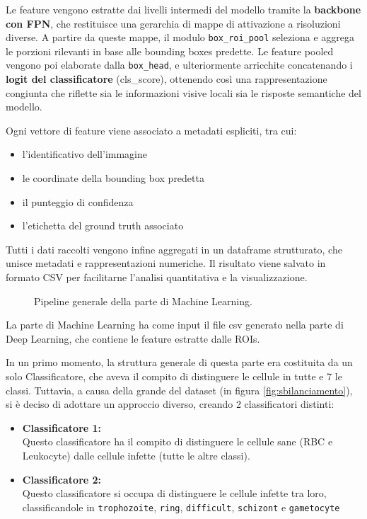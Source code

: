 \documentclass[minted, draw]{../tex/hebdomon}
\begin{document}
Le feature vengono estratte dai livelli intermedi del modello tramite la \textbf{backbone con FPN}, che restituisce una gerarchia di mappe di attivazione a risoluzioni diverse. A partire da queste mappe, il modulo \texttt{box\_roi\_pool} seleziona e aggrega le porzioni rilevanti in base alle bounding boxes predette. Le feature pooled vengono poi elaborate dalla \texttt{box\_head}, e ulteriormente arricchite concatenando i \textbf{logit del classificatore} (cls\_score), ottenendo così una rappresentazione congiunta che riflette sia le informazioni visive locali sia le risposte semantiche del modello.


Ogni vettore di feature viene associato a metadati espliciti, tra cui:
\begin{itemize}
	\item l'identificativo dell'immagine
	\item le coordinate della bounding box predetta
	\item il punteggio di confidenza
	\item l’etichetta del ground truth associato
\end{itemize}
 

Tutti i dati raccolti vengono infine aggregati in un dataframe strutturato, che unisce metadati e rappresentazioni numeriche. Il risultato viene salvato in formato CSV per facilitarne l’analisi quantitativa e la visualizzazione.



%
\begin{figure}[H]
	\centering
	
	\caption{Pipeline generale della parte di Machine Learning.}
\end{figure}
%
La parte di Machine Learning ha come input il file csv generato nella parte di Deep Learning, che contiene le feature estratte dalle ROIs.

In un primo momento, la struttura generale di questa parte era costituita da un solo Classificatore, che aveva il compito di distinguere le cellule in tutte e 7 le classi. Tuttavia, a causa della grande  del dataset (in figura \ref{fig:sbilanciamento}), si è deciso di adottare un approccio diverso, creando 2 classificatori distinti:
\begin{itemize}
	\item \textbf{Classificatore 1:}  \\
	Questo classificatore ha il compito di distinguere le cellule sane (RBC e Leukocyte) dalle cellule infette (tutte le altre classi).
	\item \textbf{Classificatore 2:}  \\
	Questo classificatore si occupa di distinguere le cellule infette tra loro, classificandole in \texttt{trophozoite}, \texttt{ring}, \texttt{difficult}, \texttt{schizont} e \texttt{gametocyte}
\end{itemize}
\end{document}
